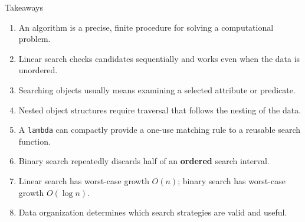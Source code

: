 \documentclass[aspectratio=169,10pt]{beamer}
\begin{document}
\begin{frame}{Takeaways}
  \begin{enumerate}
    \item An algorithm is a precise, finite procedure for solving a computational problem.
    \item Linear search checks candidates sequentially and works even when the data is unordered.
    \item Searching objects usually means examining a selected attribute or predicate.
    \item Nested object structures require traversal that follows the nesting of the data.
    \item A \texttt{lambda} can compactly provide a one-use matching rule to a reusable search function.
    \item Binary search repeatedly discards half of an \textbf{ordered} search interval.
    \item Linear search has worst-case growth $O(n)$; binary search has worst-case growth $O(\log n)$.
    \item Data organization determines which search strategies are valid and useful.
  \end{enumerate}
\end{frame}
\end{document}
